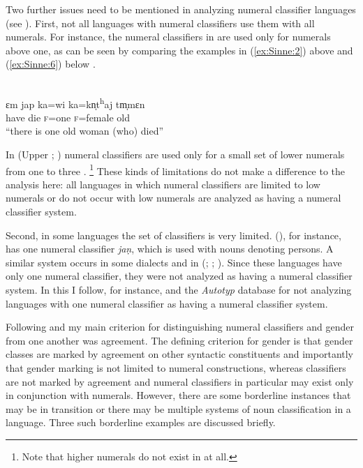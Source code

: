 \documentclass[output=collectionpaper]{langsci/langscibook}
\begin{document}
Two further issues need to be mentioned in analyzing numeral classifier languages (see \citealt{Gil2013}). First, not all languages with numeral classifiers use them with all numerals. For instance, the numeral classifiers in  are used only for numerals above one, as can be seen by comparing the examples in (\ref{ex:Sinne:2}) above and (\ref{ex:Sinne:6}) below \citep[108]{Ring2015}.

\ea\label{ex:Sinne:6}
\\
\gll ɛm jap ka=wi ka=kn̩t\textsuperscript{h}aj tm̩mɛn\\
have die \textsc{f=}one \textsc{f}=female old\\
\glt ``there is one old woman (who) died''
\z

In  (Upper ; ) numeral classifiers are used only for a small set of lower numerals from one to three \citep[56--57]{Lock2011}.%
\footnote{Note that higher numerals do not exist in  at all.} %
These kinds of limitations do not make a difference to the analysis here: all languages in which numeral classifiers are limited to low numerals or do not occur with low numerals are analyzed as having a numeral classifier system.

Second, in some languages the set of classifiers is very limited.  (), for instance, has one numeral classifier \textit{jaṇ}, which is used with nouns denoting persons. A similar system occurs in some  dialects and in  (; ; \citealt[11--12]{Emeneau1956}). Since these languages have only one numeral classifier, they were not analyzed as having a numeral classifier system. In this I follow, for instance, \citet{Nichols1992} and the \textit{Autotyp} database \citep{Bickel2017} for not analyzing languages with one numeral classifier as having a numeral classifier system.

Following \citet[129, 132]{Nichols1992} and \citet[4--5]{Corbett1991} my main criterion for distinguishing numeral classifiers and gender from one another was agreement. The defining criterion for gender is that gender classes are marked by agreement on other syntactic constituents \textendash{} and importantly that gender marking is not limited to numeral constructions, whereas classifiers are not marked by agreement and numeral classifiers in particular may exist only in conjunction with numerals. However, there are some borderline instances that may be in transition or there may be multiple systems of noun classification in a language. Three such borderline examples are discussed briefly.
\end{document}
